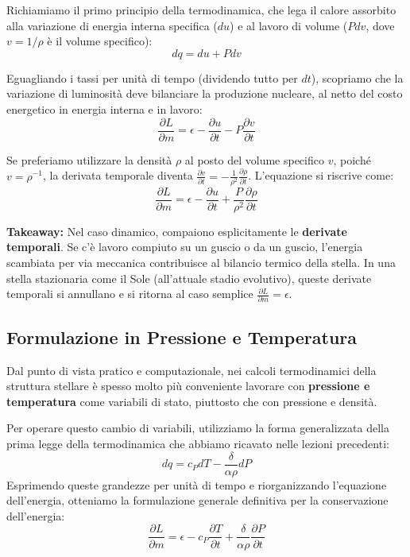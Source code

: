 Richiamiamo il primo principio della termodinamica, che lega il calore assorbito alla variazione di energia interna specifica ($du$) e al lavoro di volume ($P dv$, dove $v = 1/\rho$ è il volume specifico):
\begin{equation}
dq = du + P dv
\end{equation}

Eguagliando i tassi per unità di tempo (dividendo tutto per $dt$), scopriamo che la variazione di luminosità deve bilanciare la produzione nucleare, al netto del costo energetico in energia interna e in lavoro:
\begin{equation}
\frac{\partial L}{\partial m} = \epsilon - \frac{\partial u}{\partial t} - P \frac{\partial v}{\partial t}
\end{equation}

Se preferiamo utilizzare la densità $\rho$ al posto del volume specifico $v$, poiché $v = \rho^{-1}$, la derivata temporale diventa $\frac{\partial v}{\partial t} = - \frac{1}{\rho^2} \frac{\partial \rho}{\partial t}$. L'equazione si riscrive come:
\begin{equation}
\frac{\partial L}{\partial m} = \epsilon - \frac{\partial u}{\partial t} + \frac{P}{\rho^2} \frac{\partial \rho}{\partial t}
\end{equation}

\textbf{Takeaway:} Nel caso dinamico, compaiono esplicitamente le \textbf{derivate temporali}. Se c'è lavoro compiuto su un guscio o da un guscio, l'energia scambiata per via meccanica contribuisce al bilancio termico della stella. In una stella stazionaria come il Sole (all'attuale stadio evolutivo), queste derivate temporali si annullano e si ritorna al caso semplice $\frac{\partial L}{\partial m} = \epsilon$.

\subsection{Formulazione in Pressione e Temperatura}

Dal punto di vista pratico e computazionale, nei calcoli termodinamici della struttura stellare è spesso molto più conveniente lavorare con \textbf{pressione e temperatura} come variabili di stato, piuttosto che con pressione e densità.

Per operare questo cambio di variabili, utilizziamo la forma generalizzata della prima legge della termodinamica che abbiamo ricavato nelle lezioni precedenti:
\begin{equation}
dq = c_P dT - \frac{\delta}{\alpha \rho} dP
\end{equation}
Esprimendo queste grandezze per unità di tempo e riorganizzando l'equazione dell'energia, otteniamo la formulazione generale definitiva per la conservazione dell'energia:
\begin{equation}
\frac{\partial L}{\partial m} = \epsilon - c_P \frac{\partial T}{\partial t} + \frac{\delta}{\alpha \rho} \frac{\partial P}{\partial t}
\end{equation}

